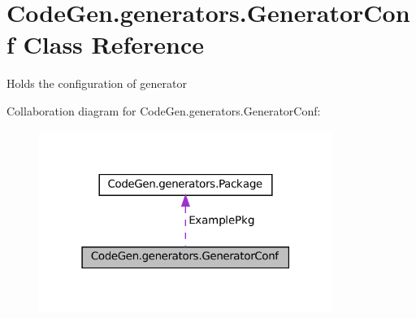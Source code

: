 \hypertarget{classCodeGen_1_1generators_1_1GeneratorConf}{}\section{Code\+Gen.\+generators.\+Generator\+Conf Class Reference}
\label{classCodeGen_1_1generators_1_1GeneratorConf}


Holds the configuration of generator  




Collaboration diagram for Code\+Gen.\+generators.\+Generator\+Conf\+:
\nopagebreak
\begin{figure}[H]
\begin{center}
\leavevmode
\includegraphics[width=271pt]{classCodeGen_1_1generators_1_1GeneratorConf__coll__graph}
\end{center}
\end{figure}
